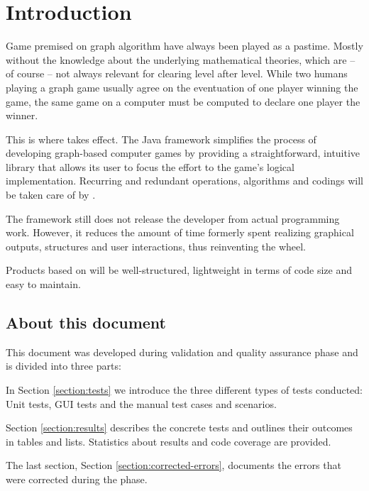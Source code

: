 \section{Introduction}
Game premised on graph algorithm have always been played as a pastime. Mostly without the knowledge about the underlying mathematical theories, which are -- of course -- not always relevant for clearing level after level. While two humans playing a graph game usually agree on the eventuation of one player winning the game, the same game on a computer must be computed to declare one player the winner.\par

This is where \graphioli takes effect. The Java framework simplifies the process of developing graph-based computer games by providing a straightforward, intuitive library that allows its user to focus the effort to the game's logical implementation. Recurring and redundant operations, algorithms and codings will be taken care of by \graphioli.\par

The framework still does not release the developer from actual programming work. However, it reduces the amount of time formerly spent realizing graphical outputs, structures and user interactions, thus reinventing the wheel.\par

Products based on \graphioli will be well-structured, lightweight in terms of code size and easy to maintain.\par

\subsection{About this document}
This document was developed during validation and quality assurance phase and is divided into three parts:\par
In Section \ref{section:tests} we introduce the three different types of tests conducted: Unit tests, GUI tests and the manual test cases and scenarios.\par
Section \ref{section:results} describes the concrete tests and outlines their outcomes in tables and lists. Statistics about results and code coverage are provided.\par
The last section, Section \ref{section:corrected-errors}, documents the errors that were corrected during the phase.\par